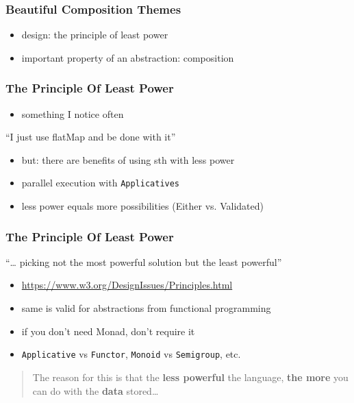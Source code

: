 \documentclass[aspectratio=169]{beamer}
\begin{document}
\begin{frame}
  \frametitle{Beautiful Composition \textemdash{} Themes}
  \begin{center}
    {
    }
  \end{center}
  \begin{itemize}
  \item design: the principle of least power
  \item important property of an abstraction: composition
  \end{itemize}
\end{frame}

\begin{frame}
  \frametitle{The Principle Of Least Power}
  \begin{itemize}
  \item something I notice often
  \end{itemize}
  \begin{tcolorbox}[
    fonttitle=\sffamily\bfseries,
    colbacktitle=black,
    colframe=black,
    coltitle=beamer@centricgreen,
    title=A Programmer
    ]
    ``I just use flatMap and be done with it''
  \end{tcolorbox}
  \begin{itemize}
  \item but: there are benefits of using sth with less power
  \item parallel execution with \texttt{Applicatives}
  \item less power equals more possibilities (Either vs. Validated)
  \end{itemize}
\end{frame}

\begin{frame}
  \frametitle{The Principle Of Least Power}
    \begin{tcolorbox}[
      fonttitle=\sffamily\bfseries,
      colbacktitle=black,
      colframe=black,
      coltitle=beamer@centricgreen,
      title=The Principle
      ]
      ``\ldots{} picking not the most powerful solution but the least powerful''
  \end{tcolorbox}
  \begin{itemize}
  \item \url{https://www.w3.org/DesignIssues/Principles.html}
  \item same is valid for abstractions from functional programming
  \item if you don't need Monad, don't require it
  \item \texttt{Applicative} vs \texttt{Functor}, \texttt{Monoid} vs \texttt{Semigroup}, etc.
  \end{itemize}
  \vfill
  \begin{quote}
    The reason for this is that the \textbf{less powerful} the language, \textbf{the
      more} you can do with the \textbf{data} stored\ldots
  \end{quote}
\end{frame}
\end{document}
